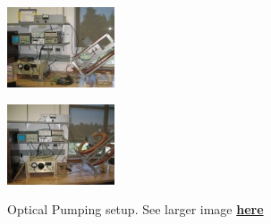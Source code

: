 \documentclass{../lab}
\begin{document}
\begin{figure}[h]
\begin{minipage}{0.32\textwidth}
    \href{http://experimentationlab.berkeley.edu/sites/default/files/images/OPT_3524.jpg}{\includegraphics[width=\linewidth,keepaspectratio]{images/OPT_3524.jpg}}
    \caption{Optical Pumping setup. See larger image \href{http://experimentationlab.berkeley.edu/sites/default/files/images/OPT_3524.jpg}{\textbf{here}}}
\end{minipage}
\begin{minipage}{0.32\textwidth}
    \href{http://experimentationlab.berkeley.edu/sites/default/files/images/OPT_3548.jpg}{\includegraphics[width=\linewidth,keepaspectratio]{images/OPT_3548.jpg}}

\end{minipage}
\end{figure}
\end{document}
